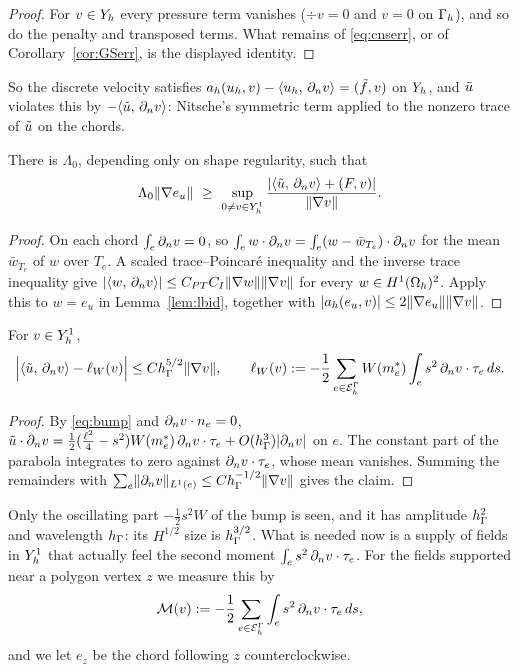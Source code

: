 \begin{proof}
For $v\in Y_h$ every pressure term vanishes ($\div v=0$ and $v=0$ on $\Gamma_h$), and so do the penalty and transposed terms. What remains of \eqref{eq:cnserr}, or of Corollary~\ref{cor:GSerr}, is the displayed identity.
\end{proof}

So the discrete velocity satisfies $a_h(u_h,v)-\langle u_h,\, \partial_n v\rangle=(\tilde f,v)$ on $Y_h$, and $\tilde u$ violates this by $-\langle \tilde u,\, \partial_n v\rangle$: Nitsche's symmetric term applied to the nonzero trace of $\tilde u$ on the chords.

\begin{lemma}\label{lem:lbabs}
There is $\Lambda_0$, depending only on shape regularity, such that
\[
\Lambda_0\lVert \nabla e_u\rVert\ \ge\ \sup_{0\ne v\in Y_h^1}\frac{|\langle \tilde u,\, \partial_n v\rangle+(F,v)|}{\lVert \nabla v\rVert} .
\]
\end{lemma}

\begin{proof}
On each chord $\int_e\partial_n v=0$, so $\int_ew\cdot\partial_n v=\int_e(w-\bar w_{T_e})\cdot\partial_n v$ for the mean $\bar w_{T_e}$ of $w$ over $T_e$. A scaled trace--Poincar\'e inequality and the inverse trace inequality give $|\langle w,\, \partial_n v\rangle|\le C_{PT}C_I\lVert \nabla w\rVert\lVert \nabla v\rVert$ for every $w\in H^1(\Omega_h)^2$. Apply this to $w=e_u$ in Lemma~\ref{lem:lbid}, together with $|a_h(e_u,v)|\le2\lVert \nabla e_u\rVert\lVert \nabla v\rVert$.
\end{proof}

\begin{lemma}\label{lem:lbexp}
For $v\in Y_h^1$,
\[
\Bigl|\langle \tilde u,\, \partial_n v\rangle-\ell_W(v)\Bigr|\le Ch_\Gamma^{5/2}\lVert \nabla v\rVert,\qquad \ell_W(v):=-\frac12\sum_{e\in\mathcal E_h^\Gamma}W(m_e^\ast)\int_e s^2\,\partial_n v\cdot\tau_e\,ds .
\]
\end{lemma}

\begin{proof}
By \eqref{eq:bump} and $\partial_n v\cdot n_e=0$, $\tilde u\cdot\partial_n v=\frac12(\frac{\ell^2}4-s^2)W(m_e^\ast)\,\partial_n v\cdot\tau_e+O(h_\Gamma^3)|\partial_n v|$ on $e$. The constant part of the parabola integrates to zero against $\partial_n v\cdot\tau_e$, whose mean vanishes. Summing the remainders with $\sum_e\lVert \partial_n v\rVert_{L^1(e)}\le Ch_\Gamma^{-1/2}\lVert \nabla v\rVert$ gives the claim.
\end{proof}

Only the oscillating part $-\frac12s^2W$ of the bump is seen, and it has amplitude $h_\Gamma^2$ and wavelength $h_\Gamma$: its $H^{1/2}$ size is $h_\Gamma^{3/2}$. What is needed now is a supply of fields in $Y_h^1$ that actually feel the second moment $\int_es^2\,\partial_n v\cdot\tau_e$. For the fields supported near a polygon vertex $z$ we measure this by
\[
\mathcal M(v):=-\frac12\sum_{e\in\mathcal E_h^\Gamma}\int_e s^2\,\partial_n v\cdot\tau_e\,ds ,
\]
and we let $e_z$ be the chord following $z$ counterclockwise.

